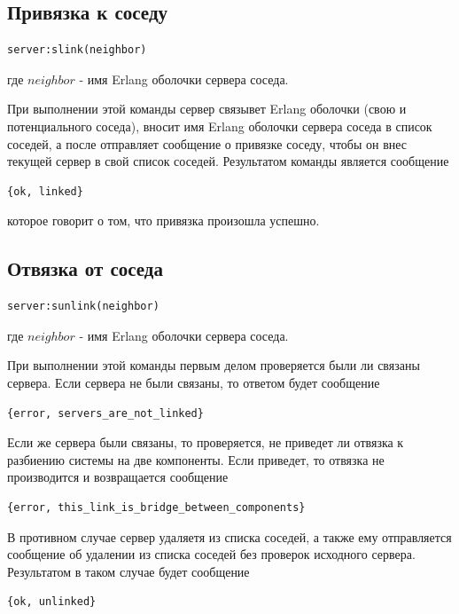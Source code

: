 		\subsection{Привязка к соседу}
			\begin{lstlisting}
server:slink(neighbor)
			\end{lstlisting}
			где $neighbor$ - имя Erlang оболочки сервера соседа.

			При выполнении этой команды сервер связывет Erlang оболочки (свою и потенциального соседа), вносит имя Erlang оболочки сервера соседа 
			в список соседей, а после отправляет сообщение о привязке соседу, чтобы он внес текущей сервер в свой список соседей. Результатом команды 
			является сообщение 
			\begin{lstlisting}
{ok, linked}
			\end{lstlisting}
			которое говорит о том, что привязка произошла успешно.

		\subsection{Отвязка от соседа}
			\begin{lstlisting}
server:sunlink(neighbor)
			\end{lstlisting}
			где $neighbor$ - имя Erlang оболочки сервера соседа.

			При выполнении этой команды первым делом проверяется были ли связаны сервера. Если сервера не были связаны, то ответом будет сообщение
			\begin{lstlisting}
{error, servers_are_not_linked}
			\end{lstlisting}
			Если же сервера были связаны, то проверяется, не приведет ли отвязка к разбиению системы на две компоненты. Если приведет, то отвязка не 
			производится и возвращается сообщение
			\begin{lstlisting}
{error, this_link_is_bridge_between_components}
			\end{lstlisting}
			В противном случае сервер удаляетя из списка соседей, а также ему отправляется сообщение об удалении из списка соседей без проверок
			исходного сервера. Результатом в таком случае будет сообщение
			\begin{lstlisting}
{ok, unlinked}
			\end{lstlisting}
			


